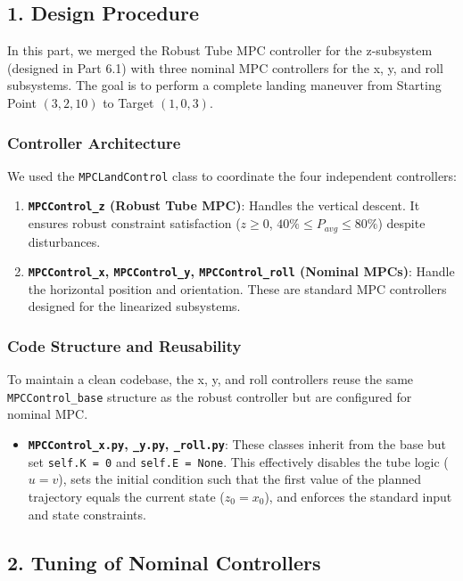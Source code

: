 \documentclass{article}
\begin{document}
\subsection*{1. Design Procedure}

In this part, we merged the Robust Tube MPC controller for the z-subsystem (designed in Part 6.1) with three nominal MPC controllers for the x, y, and roll subsystems. The goal is to perform a complete landing maneuver from Starting Point $(3, 2, 10)$ to Target $(1, 0, 3)$.

\subsubsection*{Controller Architecture}

We used the \texttt{MPCLandControl} class to coordinate the four independent controllers:
\begin{enumerate}
    \item \textbf{\texttt{MPCControl\_z} (Robust Tube MPC)}: Handles the vertical descent. It ensures robust constraint satisfaction ($z \ge 0$, $40\% \le P_{avg} \le 80\%$) despite disturbances.
    \item \textbf{\texttt{MPCControl\_x}, \texttt{MPCControl\_y}, \texttt{MPCControl\_roll} (Nominal MPCs)}: Handle the horizontal position and orientation. These are standard MPC controllers designed for the linearized subsystems.
\end{enumerate}

\subsubsection*{Code Structure and Reusability}

To maintain a clean codebase, the x, y, and roll controllers reuse the same \texttt{MPCControl\_base} structure as the robust controller but are configured for nominal MPC. 
\begin{itemize}
    \item \textbf{\texttt{MPCControl\_x.py}, \texttt{\_y.py}, \texttt{\_roll.py}}: These classes inherit from the base but set \texttt{self.K = 0} and \texttt{self.E = None}. This effectively disables the tube logic ($u = v$), sets the initial condition such that the first value of the planned trajectory equals the current state ($z_0 = x_0$), and enforces the standard input and state constraints.
\end{itemize}

\subsection*{2. Tuning of Nominal Controllers}
\end{document}

